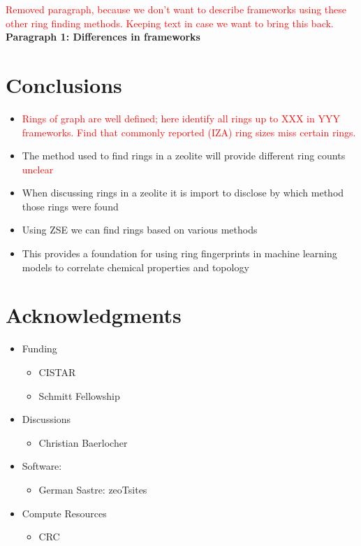 \documentclass[11pt]{article}
\newcommand{\red}[1]{\textcolor{red}{#1}}
\begin{document}
\newpage
\red{Removed paragraph, because we don't want to describe frameworks using these other ring finding methods. Keeping text in case we want to bring this back.}
\textbf{\textbf{Paragraph 1: Differences in frameworks}}


\section{Conclusions}
\label{sec:org2135ac7}
\begin{itemize}
\item \red{Rings of graph are well defined; here identify all rings up to XXX in YYY frameworks. Find that commonly reported (IZA) ring sizes miss certain rings.}
\end{itemize}


\begin{itemize}
\item The method used to find rings in a zeolite will provide different ring counts \red{unclear}
\item When discussing rings in a zeolite it is import to disclose by which method those rings were found
\item Using ZSE we can find rings based on various methods
\item This provides a foundation for using ring fingerprints in machine learning models to correlate chemical properties and topology
\end{itemize}





\section{Acknowledgments}
\label{sec:org7b1d020}
\begin{itemize}
\item Funding
\begin{itemize}
\item CISTAR
\item Schmitt Fellowship
\end{itemize}
\item Discussions
\begin{itemize}
\item Christian Baerlocher
\end{itemize}
\item Software:
\begin{itemize}
\item German Sastre: zeoTsites
\end{itemize}
\item Compute Resources
\begin{itemize}
\item CRC
\end{itemize}
\end{itemize}
\end{document}
